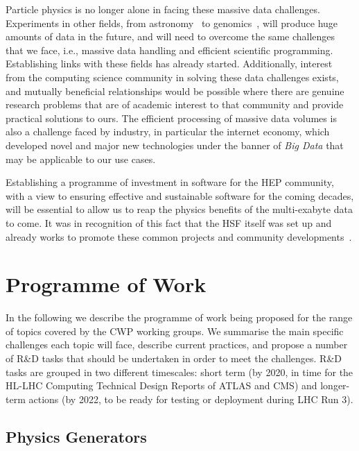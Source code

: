 Particle physics is no longer alone in facing these massive data
challenges. Experiments in other fields, from astronomy~\cite{10.1371/journal.pbio.1002195} 
to genomics~\cite{ijms18020412},
will produce huge amounts of data in the future, and will need to
overcome the same challenges that we face, i.e., massive data handling and
efficient scientific programming. Establishing links with these fields
has already started. Additionally, interest from the computing science
community in solving these data challenges exists, and mutually
beneficial relationships would be possible where there are genuine
research problems that are of academic interest to that community and
provide practical solutions to ours. The efficient processing of massive
data volumes is also a challenge faced by industry, in particular the
internet economy, which developed novel and major new technologies under
the banner of \emph{Big Data} that may be applicable to our use cases.

Establishing a programme of investment in software for the HEP
community, with a view to ensuring effective and sustainable software
for the coming decades, will be essential to allow us to reap the
physics benefits of the multi-exabyte data to come. It was in recognition of
this fact that the HSF itself was set up and already works to promote
these common projects and community developments~\cite{HSF2015}.

\hypertarget{programme-of-work}{%
\section{Programme of Work}\label{programme-of-work}}

In the following we describe the programme of work being proposed for
the range of topics covered by the CWP working groups. We summarise the
main specific challenges each topic will face, describe current
practices, and propose a number of R\&D tasks that should be undertaken
in order to meet the challenges. R\&D tasks are grouped in two different
timescales: short term (by 2020, in time for the HL-LHC Computing Technical Design Reports of
ATLAS and CMS) and longer-term actions (by 2022, to be ready for testing
or deployment during LHC Run 3).


\hypertarget{physics-generators}{%
\subsection{Physics Generators}\label{physics-generators}}

